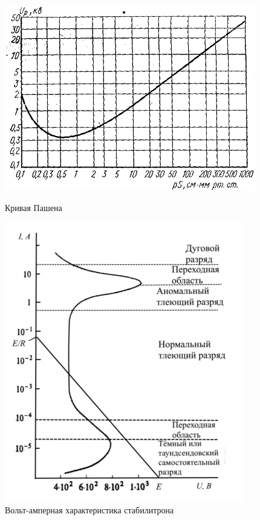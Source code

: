 \documentclass[a4paper]{article}
\begin{document}
\begin{figure}[H]
\begin{center}
\begin{minipage}[h]{0.4\linewidth}
\includegraphics[width=1\linewidth]{pash.PNG}
\caption{Кривая Пашена} %
\label{ris:experimoriginal} %
\end{minipage}
\hfill 
\begin{minipage}[H]{0.35\linewidth}
\includegraphics[width=1\linewidth]{va.PNG}
\caption{Вольт-амперная характеристика стабилитрона}
\label{ris:experimcoded}
\end{minipage}
\end{center}
\end{figure}
\end{document}
